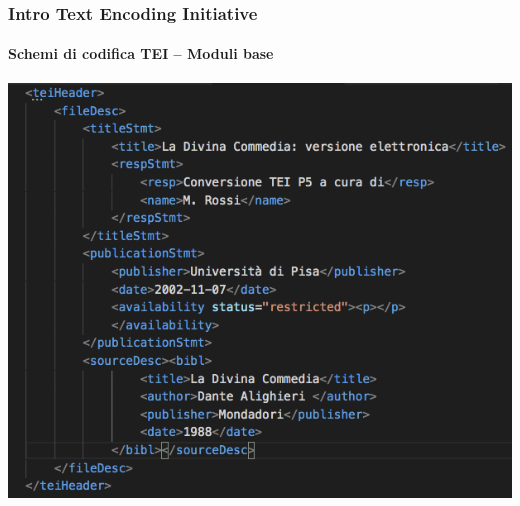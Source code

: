 





\begin{frame}
	\frametitle{Intro Text Encoding Initiative}
	\framesubtitle{Schemi di codifica TEI – Moduli base}
	\addtocounter{nframe}{1}

	\begin{center}
		\includegraphics[width=.8\textwidth]{imgs/header2.png}
	\end{center}
	

\end{frame}



